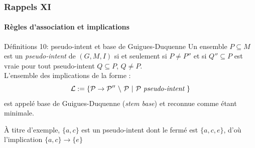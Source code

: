 \documentclass[french]{beamer}
\def\KK{\mathbb{K}}
\def\KKn{\tilde{\mathbb{K}}}
\def\KKc{\mathbb{K}|\tilde{\mathbb{K}}}
\begin{document}
\begin{frame}
\frametitle{Rappels XI}
\framesubtitle{Règles d'association et implications}
\begin{block}{Définitions 10: pseudo-intent et base de Guigues-Duquenne}
Un ensemble $P \subseteq M$ est un \emph{pseudo-intent} de $(G, M, I)$ 
si et seulement si $P \neq P''$ et si $Q'' \subseteq P$ est vraie pour tout pseudo-intent $Q \subseteq P$, $Q \ne P.$ \\
L'ensemble des implications de la forme :
$$\cal{L} := \{ P \rightarrow P''\ \backslash\ P\ |\ P\ \textit{pseudo-intent}\ \}$$
est appelé base de Guigues-Duquenne (\emph{stem base}) et reconnue comme étant minimale.
\end{block}
À titre d'exemple, $\{a, c\}$ est un pseudo-intent dont le fermé est $\{a, c, e\}$, d'où l'implication $\{a, c\} \rightarrow \{e\}$
\end{frame}

\end{document}
